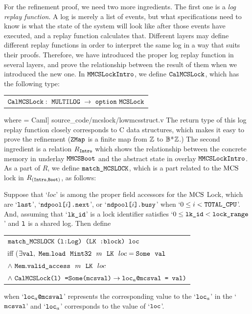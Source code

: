 For the refinement proof, we need two more ingredients.
The first one is a \emph{log replay function}.
A log is merely a list of events, but what specifications need to know is what the state of the system will look like after those events have executed,
and a replay function calculates that. 
Different layers may define different replay functions in order to interpret the same log in a way that suits their proofs.
Therefore, we have introduced the proper log replay function in several layers, and prove the relationship between the result of them when we introduced the new one.
In ${\mathrm{\texttt{MMCSLockIntro}}}$, we define ${\mathrm{\texttt{CalMCSLock}}}$, which has the following type:\newline
\begin{tabular}{P{0.95\textwidth}}
$ \calmcslock :\ \lockmultilog\ \rightarrow\ \optiondef\ \lockabsloc$
\end{tabular}\newline
where
 = Caml] {source_code/mcslock/lowmcsstruct.v}
The return type of this log replay function closely corresponds to C data structures, which makes it easy to prove the refinement (${\mathrm{\texttt{ZMap}}}$ is a finite map from ${\mathbb{Z}}$ to ${\mathbb{B}}$*${\mathbb{Z}}$.)
The second ingredient is a relation $R_{{\mathrm{\texttt{Intro}}}}$ which shows the relationship between the concrete memory in underlay ${\mathrm{\texttt{MMCSBoot}}}$ and the abstract state in overlay ${\mathrm{\texttt{MMCSLockIntro}}}$.
As a part of $R$, we define $\matchmcslock$, which is a part related to 
the $\mathrm{MCS}$ lock in $R_{({\mathrm{\texttt{Intro}}}, {\mathrm{\texttt{Boot}}})}$,  as follows:

\begin{definition}[$\matchmcslock$]
Suppose that `$loc$' is among the proper field accessors for the $\mathrm{MCS}$ Lock, which are `${\mathrm{\texttt{last}}}$', `${\mathrm{\texttt{ndpool[}}}i{\mathrm{\texttt{].next}}}$', or  `${\mathrm{\texttt{ndpool[}}}i{\mathrm{\texttt{].busy}}}$' when `$0 \leq i < {\mathrm{\texttt{TOTAL\_CPU}}}$'.
 And, assuming that `${\mathrm{\texttt{lk\_id}}}$' is a lock identifier satisfies `$0 \leq {\mathrm{\texttt{lk\_id}}} < {\mathrm{\texttt{lock\_range}}}$' and ${\mathrm{\texttt{l}}}$ is a shared log. Then define \newline
  \begin{tabular}{P{0.90\textwidth}}
    $\matchmcslock\ \codeinmath{(l:Log) (}\lockmemloc\codeinmath{ :block) loc}$\\
      iff ($\exists \codeinmath{val},\ \memloadsome{\memintregulartype}{m}{\lockmemloc}{loc}{\codeinmath{val}}$\\
        $\wedge\  {\mathrm{\texttt{Mem}}} . {\mathrm{\texttt{valid\_access}}} ~~{m} ~~ {{\mathrm{\texttt{LK}}}} ~~ {loc}$\\
      $\wedge\ \calmcslock \codeinmath{(l) =}\Some\codeinmath{(mcsval)}\rightarrow\codeinmath{loc}_{a}\codeinmath{@mcsval = val)}$\\
\end{tabular}\newline
    when `${\mathrm{\texttt{loc}}}_{a}{\mathrm{\texttt{@mcsval}}}$' represents the corresponding 
    value to the `${\mathrm{\texttt{loc}}}_{a}$' in the `${\mathrm{\texttt{mcsval}}}$' 
    and `${\mathrm{\texttt{loc}}}_{a}$' corresponds to the value of `${\mathrm{\texttt{loc}}}$'.
\end{definition}

